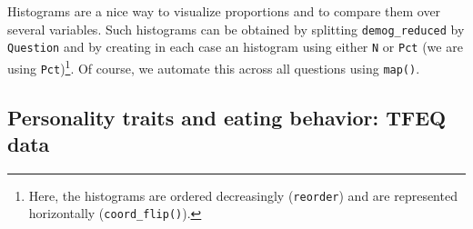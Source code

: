 \documentclass[
]{book}
\newenvironment{Shaded}{\begin{snugshade}}{\end{snugshade}}
\newcommand{\AttributeTok}[1]{\textcolor[rgb]{0.77,0.63,0.00}{#1}}
\newcommand{\ControlFlowTok}[1]{\textcolor[rgb]{0.13,0.29,0.53}{\textbf{#1}}}
\newcommand{\DecValTok}[1]{\textcolor[rgb]{0.00,0.00,0.81}{#1}}
\newcommand{\FunctionTok}[1]{\textcolor[rgb]{0.00,0.00,0.00}{#1}}
\newcommand{\NormalTok}[1]{#1}
\newcommand{\OtherTok}[1]{\textcolor[rgb]{0.56,0.35,0.01}{#1}}
\newcommand{\SpecialCharTok}[1]{\textcolor[rgb]{0.00,0.00,0.00}{#1}}
\newcommand{\StringTok}[1]{\textcolor[rgb]{0.31,0.60,0.02}{#1}}
\begin{document}
Histograms are a nice way to visualize proportions and to compare them over several variables. Such histograms can be obtained by splitting \texttt{demog\_reduced} by \texttt{Question} and by creating in each case an histogram using either \texttt{N} or \texttt{Pct} (we are using \texttt{Pct})\footnote{Here, the histograms are ordered decreasingly (\texttt{reorder}) and are represented horizontally (\texttt{coord\_flip()}).}. Of course, we automate this across all questions using \texttt{map()}.

\begin{Shaded}
\end{Shaded}

\hypertarget{personality-traits-and-eating-behavior-tfeq-data}{%
\subsection{Personality traits and eating behavior: TFEQ data}\label{personality-traits-and-eating-behavior-tfeq-data}}
\end{document}
